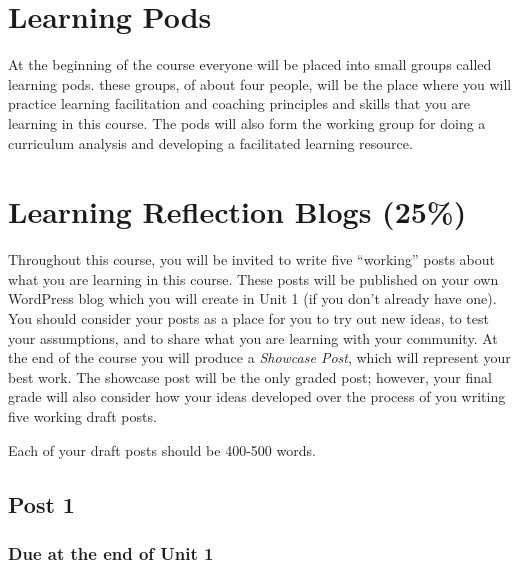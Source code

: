 \documentclass[
]{book}
\begin{document}
\hypertarget{learning-pods}{%
\section*{Learning Pods}\label{learning-pods}}

At the beginning of the course everyone will be placed into small groups called learning pods. these groups, of about four people, will be the place where you will practice learning facilitation and coaching principles and skills that you are learning in this course. The pods will also form the working group for doing a curriculum analysis and developing a facilitated learning resource.

\hypertarget{learning-reflection-blogs-25}{%
\section*{Learning Reflection Blogs (25\%)}\label{learning-reflection-blogs-25}}

Throughout this course, you will be invited to write five ``working'' posts about what you are learning in this course. These posts will be published on your own WordPress blog which you will create in Unit 1 (if you don't already have one). You should consider your posts as a place for you to try out new ideas, to test your assumptions, and to share what you are learning with your community. At the end of the course you will produce a \emph{Showcase Post}, which will represent your best work. The showcase post will be the only graded post; however, your final grade will also consider how your ideas developed over the process of you writing five working draft posts.

Each of your draft posts should be 400-500 words.

\hypertarget{post-1}{%
\subsection*{Post 1}\label{post-1}}

\hypertarget{due-at-the-end-of-unit-1}{%
\subsubsection*{Due at the end of Unit 1}\label{due-at-the-end-of-unit-1}}
\end{document}
